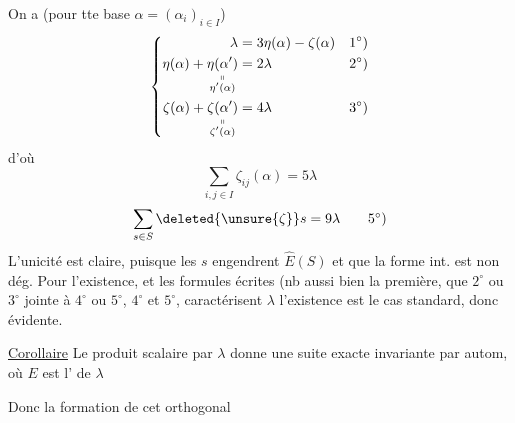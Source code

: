 On a  (pour tte base $\alpha=(\alpha_i)_{i\in I}$)
\[
\left\{\begin{aligned}
\lambda&=3\eta(\alpha)-\zeta(\alpha)&&1^\circ)\\
\eta(\alpha)+\underset{\substack{\shortparallel\\\eta'(\alpha)}}{\eta(\alpha')}&=2\lambda&&2^\circ)\\
\zeta(\alpha)+\underset{\substack{\shortparallel\\\zeta'(\alpha)}}{\zeta(\alpha')}&=4\lambda&&3^\circ)
\end{aligned}\right.
\]
d'où
\[
\sum_{i,j\in I}\zeta_{ij}(\alpha)=5\lambda\tag*{$4^\circ)$}
\]
\[
\sum_{s\in S}\deleted{\unsure{\zeta}}s=9\lambda\tag*{$5^\circ)$}
\]
L'unicité est claire, puisque les $s$  engendrent $\widehat E(S)$ et que la forme int. est non dég. Pour l'existence, et les  formules écrites (nb aussi bien la première, que  $2^\circ$ ou $3^\circ$ jointe à $4^\circ$ ou $5^\circ$,   $4^\circ$ et $5^\circ$, caractérisent $\lambda$\unsure{]|)} l'existence est   le cas standard, donc évidente.

\uline{Corollaire}  \deleted{\unsure{(}} Le produit scalaire par $\lambda$ donne une suite exacte invariante par autom,
où $E$ est l' de $\lambda$

Donc la formation de cet orthogonal
